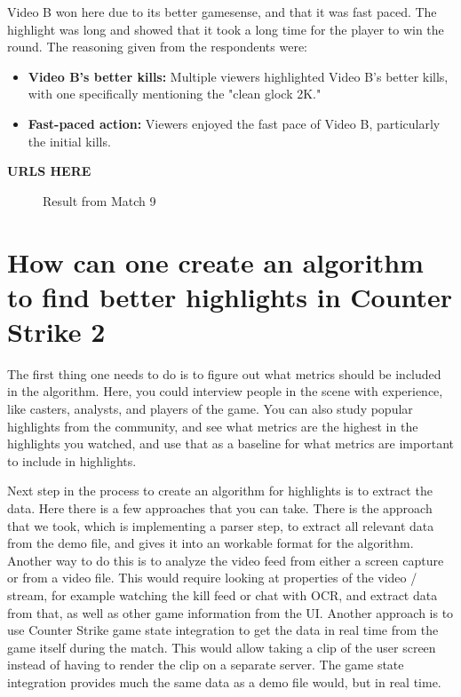 Video B won here due to its better gamesense, and that it was fast paced. The highlight was long and showed that it took a long time for the player to win the round.
The reasoning given from the respondents were:

\begin{itemize}
\item \textbf{Video B's better kills:} Multiple viewers highlighted Video B's better kills, with one specifically mentioning the "clean glock 2K."
\item \textbf{Fast-paced action:} Viewers enjoyed the fast pace of Video B, particularly the initial kills.
\end{itemize}
\textbf{URLS HERE}
\begin{figure}
\centering
{}
\caption{Result from Match 9}
\label{fig:match9}
\end{figure}

\section{How can one create an algorithm to find better highlights in Counter Strike 2}
The first thing one needs to do is to figure out what metrics should be included in the algorithm. Here, you could interview people in the scene with experience, like casters, analysts, and players of the game. You can also study popular highlights from the community, and see what metrics are the highest in the highlights you watched, and use that as a baseline for what metrics are important to include in highlights. 

Next step in the process to create an algorithm for highlights is to extract the data. Here there is a few approaches that you can take. There is the approach that we took, which is implementing a parser step, to extract all relevant data from the demo file, and gives it into an workable format for the algorithm. Another way to do this is to analyze the video feed from either a screen capture or from a video file. This would require looking at properties of the video / stream, for example watching the kill feed or chat with OCR, and extract data from that, as well as other game information from the UI. Another approach is to use Counter Strike game state integration to get the data in real time from the game itself during the match. This would allow taking a clip of the user screen instead of having to render the clip on a separate server. The game state integration provides much the same data as a demo file would, but in real time.

